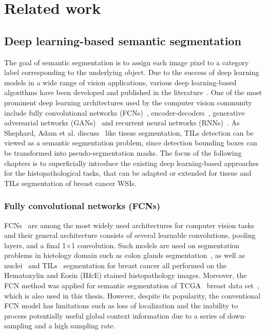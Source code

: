 \chapter{Related work}

\section{Deep learning-based semantic segmentation}
The goal of semantic segmentation is to assign each image pixel
to a category label corresponding to the underlying object.
Due to the success of deep learning models in a wide range of vision applications,
various deep learning-based algorithms have been developed and
published in the literature~\cite{minaee2021image}.
One of the most prominent deep learning architectures used by the computer vision
community include fully convolutional networks (FCNs)~\cite{long2015fully},
encoder-decoders~\cite{noh2015learning}, generative adversarial networks
(GANs)~\cite{goodfellow2014generative} and recurrent neural networks (RNNs)~\cite{rumelhart1986learning}.
As Shephard, Adam et al. discuss~\cite{shephard2022tiager} like tissue segmentation, TILs detection
can be viewed as a semantic segmentation problem, since detection bounding boxes can be transformed
into pseudo-segmentation masks. The focus of the following chapters is to superficially introduce
the existing deep learning-based approaches for the histopathological tasks, that can be adapted or
extended for tissue and TILs segmentation of breast cancer WSIs.


\subsection{Fully convolutional networks (FCNs)}
FCNs~\cite{long2015fully} are among the most widely used architectures for computer vision
tasks and their general architecture consists of several learnable convolutions, pooling layers,
and a final 1$\times$1 convolution. Such models are used on segmentation problems
in histology domain such as colon glands segmentation~\cite{bentaieb2016topology},
as well as nuclei~\cite{natarajan2020segmentation} and TILs~\cite{amgad2019joint} segmentation for
breast cancer all performed on the Hematoxylin and Eosin (H\&E) stained histopathology images.
Moreover, the FCN method was applied for semantic segmentation of TCGA~\cite{gutman2013cancer}
breast data set~\cite{amgad2019structured}, which is also used in this thesis. However,
despite its popularity, the conventional FCN model has limitations such as loss of localization
and the inability to process potentially useful global context information due to a series of
down-sampling and a high sampling rate.

